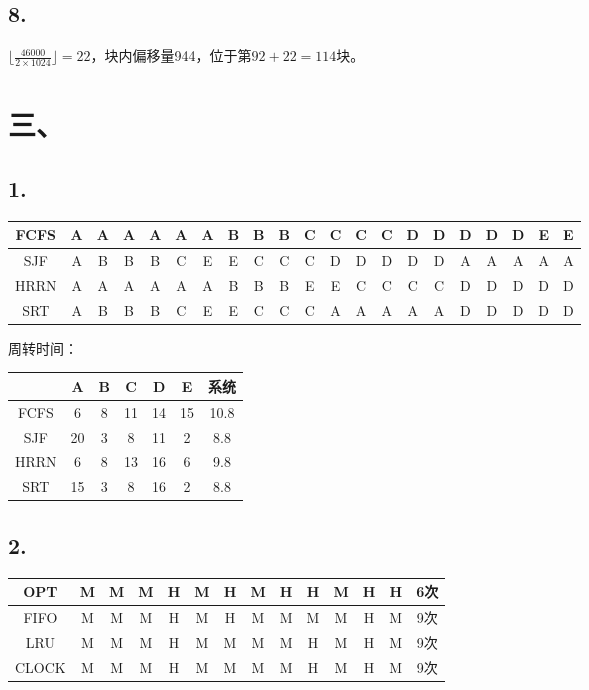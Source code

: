 \documentclass[UTF8]{ctexart}
\begin{document}
\subsection*{8.}
$\lfloor \frac{46000}{2\times 1024} \rfloor = 22 $，块内偏移量944，位于第$92+22=114$块。\\
\section*{三、}
\subsection*{1.}
\begin{tabular}{|c|c|c|c|c |c|c|c|c|c |c|c|c|c|c |c|c|c|c|c |c|}
\hline
FCFS &A&A&A&A&A&A&B&B&B&C&C&C&C&D&D&D&D&D&E&E\\
\hline
SJF  &A&B&B&B&C&E&E&C&C&C&D&D&D&D&D&A&A&A&A&A\\
\hline
HRRN &A&A&A&A&A&A&B&B&B&E&E&C&C&C&C&D&D&D&D&D\\
\hline
SRT  &A&B&B&B&C&E&E&C&C&C&A&A&A&A&A&D&D&D&D&D\\
\hline
\end{tabular}
\newline
周转时间：\\
\begin{tabular}{|c|c|c|c|c |c|c|}
\hline
$\quad$&A &B &C &D &E &系统 \\
\hline
FCFS   &6 &8 &11&14&15&10.8 \\ 
\hline
SJF    &20&3 &8 &11&2 &8.8  \\
\hline
HRRN   &6 &8 &13&16&6 &9.8  \\
\hline
SRT    &15&3 &8 &16&2 &8.8  \\
\hline
\end{tabular}
\newline
\subsection*{2.}
\begin{tabular}{|c|c|c|c|c |c|c|c|c|c |c|c|c|c| }
    \hline
    OPT  &M&M&M&H&M&H&M&H&H&M&H&H&6次\\
    \hline
    FIFO &M&M&M&H&M&H&M&M&M&M&H&M&9次\\
    \hline
    LRU  &M&M&M&H&M&M&M&M&H&M&H&M&9次\\
    \hline
    CLOCK&M&M&M&H&M&M&M&M&H&M&H&M&9次\\
    \hline 

\end{tabular}
\end{document}
